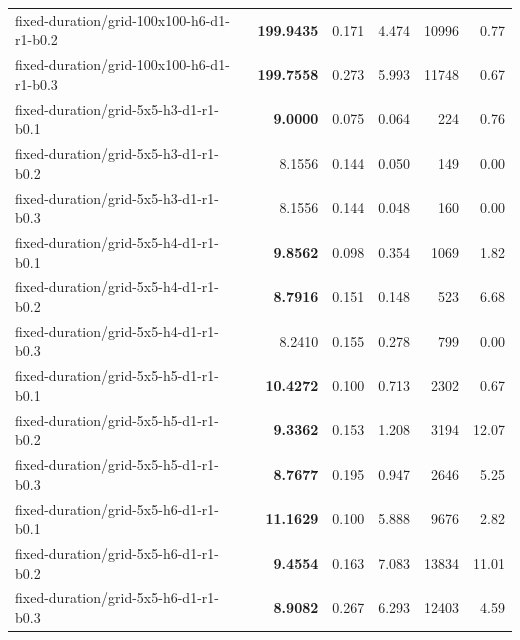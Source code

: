 \documentclass[10pt]{article}
\begin{document}
\begin{tabular}{p{65mm}rrrrr}
fixed-\allowbreak duration/\allowbreak grid-\allowbreak 100x100-\allowbreak h6-\allowbreak d1-\allowbreak r1-\allowbreak b0.2 & \textbf{199.9435} & 0.171 & 4.474 & 10996 & 0.77 \\
fixed-\allowbreak duration/\allowbreak grid-\allowbreak 100x100-\allowbreak h6-\allowbreak d1-\allowbreak r1-\allowbreak b0.3 & \textbf{199.7558} & 0.273 & 5.993 & 11748 & 0.67 \\
fixed-\allowbreak duration/\allowbreak grid-\allowbreak 5x5-\allowbreak h3-\allowbreak d1-\allowbreak r1-\allowbreak b0.1 & \textbf{9.0000} & 0.075 & 0.064 & 224 & 0.76 \\
fixed-\allowbreak duration/\allowbreak grid-\allowbreak 5x5-\allowbreak h3-\allowbreak d1-\allowbreak r1-\allowbreak b0.2 & 8.1556 & 0.144 & 0.050 & 149 & 0.00 \\
fixed-\allowbreak duration/\allowbreak grid-\allowbreak 5x5-\allowbreak h3-\allowbreak d1-\allowbreak r1-\allowbreak b0.3 & 8.1556 & 0.144 & 0.048 & 160 & 0.00 \\
fixed-\allowbreak duration/\allowbreak grid-\allowbreak 5x5-\allowbreak h4-\allowbreak d1-\allowbreak r1-\allowbreak b0.1 & \textbf{9.8562} & 0.098 & 0.354 & 1069 & 1.82 \\
fixed-\allowbreak duration/\allowbreak grid-\allowbreak 5x5-\allowbreak h4-\allowbreak d1-\allowbreak r1-\allowbreak b0.2 & \textbf{8.7916} & 0.151 & 0.148 & 523 & 6.68 \\
fixed-\allowbreak duration/\allowbreak grid-\allowbreak 5x5-\allowbreak h4-\allowbreak d1-\allowbreak r1-\allowbreak b0.3 & 8.2410 & 0.155 & 0.278 & 799 & 0.00 \\
fixed-\allowbreak duration/\allowbreak grid-\allowbreak 5x5-\allowbreak h5-\allowbreak d1-\allowbreak r1-\allowbreak b0.1 & \textbf{10.4272} & 0.100 & 0.713 & 2302 & 0.67 \\
fixed-\allowbreak duration/\allowbreak grid-\allowbreak 5x5-\allowbreak h5-\allowbreak d1-\allowbreak r1-\allowbreak b0.2 & \textbf{9.3362} & 0.153 & 1.208 & 3194 & 12.07 \\
fixed-\allowbreak duration/\allowbreak grid-\allowbreak 5x5-\allowbreak h5-\allowbreak d1-\allowbreak r1-\allowbreak b0.3 & \textbf{8.7677} & 0.195 & 0.947 & 2646 & 5.25 \\
fixed-\allowbreak duration/\allowbreak grid-\allowbreak 5x5-\allowbreak h6-\allowbreak d1-\allowbreak r1-\allowbreak b0.1 & \textbf{11.1629} & 0.100 & 5.888 & 9676 & 2.82 \\
fixed-\allowbreak duration/\allowbreak grid-\allowbreak 5x5-\allowbreak h6-\allowbreak d1-\allowbreak r1-\allowbreak b0.2 & \textbf{9.4554} & 0.163 & 7.083 & 13834 & 11.01 \\
fixed-\allowbreak duration/\allowbreak grid-\allowbreak 5x5-\allowbreak h6-\allowbreak d1-\allowbreak r1-\allowbreak b0.3 & \textbf{8.9082} & 0.267 & 6.293 & 12403 & 4.59 \\
\bottomrule\end{tabular}\par
\end{document}
